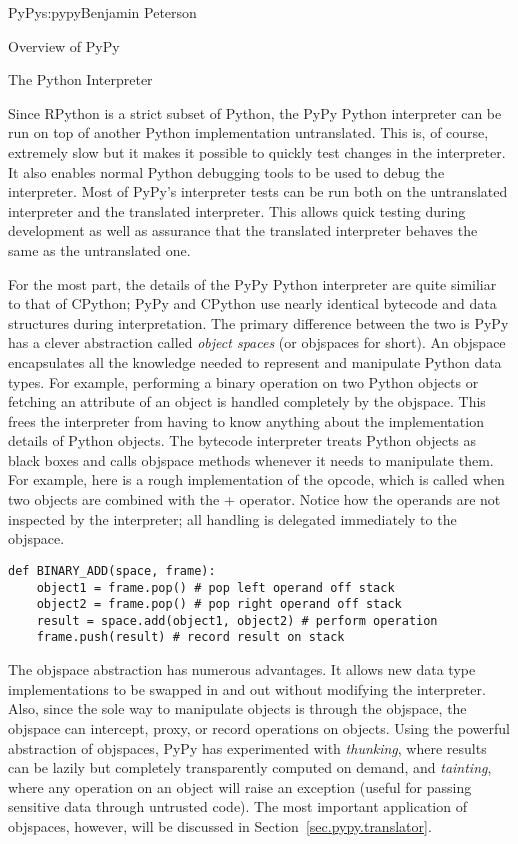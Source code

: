 \begin{aosachapter}{PyPy}{s:pypy}{Benjamin Peterson}
\begin{aosasect1}{Overview of PyPy}
\end{aosasect1}

\begin{aosasect1}{The Python Interpreter}

Since RPython is a strict subset of Python, the PyPy Python interpreter can be
run on top of another Python implementation untranslated. This is, of course,
extremely slow but it makes it possible to quickly test changes in the
interpreter. It also enables normal Python debugging tools to be used to debug
the interpreter. Most of PyPy's interpreter tests can be run both on the
untranslated interpreter and the translated interpreter. This allows quick
testing during development as well as assurance that the translated interpreter
behaves the same as the untranslated one.

For the most part, the details of the PyPy Python interpreter are quite similiar
to that of CPython; PyPy and CPython use nearly identical bytecode and data
structures during interpretation. The primary difference between the two is PyPy
has a clever abstraction called \emph{object spaces} (or objspaces for
short). An objspace encapsulates all the knowledge needed to represent and
manipulate Python data types. For example, performing a binary operation on two
Python objects or fetching an attribute of an object is handled completely by
the objspace. This frees the interpreter from having to know anything about the
implementation details of Python objects. The bytecode interpreter treats Python
objects as black boxes and calls objspace methods whenever it needs to
manipulate them. For example, here is a rough implementation of the
 opcode, which is called when two objects are combined with the
+ operator. Notice how the operands are not inspected by the interpreter; all
handling is delegated immediately to the objspace.

\begin{verbatim}
def BINARY_ADD(space, frame):
    object1 = frame.pop() # pop left operand off stack
    object2 = frame.pop() # pop right operand off stack
    result = space.add(object1, object2) # perform operation
    frame.push(result) # record result on stack
\end{verbatim}

The objspace abstraction has numerous advantages. It allows new data type
implementations to be swapped in and out without modifying the
interpreter. Also, since the sole way to manipulate objects is through the
objspace, the objspace can intercept, proxy, or record operations on
objects. Using the powerful abstraction of objspaces, PyPy has experimented with
\emph{thunking}, where results can be lazily but completely transparently computed on
demand, and \emph{tainting}, where any operation on an object will raise an exception
(useful for passing sensitive data through untrusted code). The most important
application of objspaces, however, will be discussed in
Section~\ref{sec.pypy.translator}.


\end{aosasect1}
\end{aosachapter}
